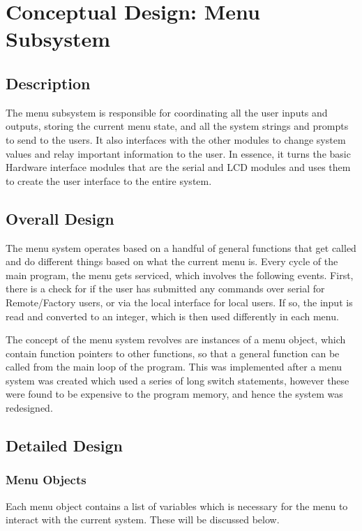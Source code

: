 \documentclass[]{report}
\begin{document}
\section{Conceptual Design: Menu Subsystem}
\subsection{Description}
The menu subsystem is responsible for coordinating all the user inputs and outputs, storing the current menu state, and all the system strings and prompts to send to the users. It also interfaces with the other modules to change system values and relay important information to the user. In essence, it turns the basic Hardware interface modules that are the serial and LCD modules and uses them to create the user interface to the entire system.

\subsection{Overall Design}
The menu system operates based on a handful of general functions that get called and do different things based on what the current menu is. Every cycle of the main program, the menu gets serviced, which involves the following events. First, there is a check for if the user has submitted any commands over serial for Remote/Factory users, or via the local interface for local users. If so, the input is read and converted to an integer, which is then used differently in each menu.

The concept of the menu system revolves are instances of a menu object, which contain function pointers to other functions, so that a general function can be called from the main loop of the program. This was implemented after a menu system was created which used a series of long switch statements, however these were found to be expensive to the program memory, and hence the system was redesigned.

\subsection{Detailed Design}

\subsubsection{Menu Objects}
Each menu object contains a list of variables which is necessary for the menu to interact with the current system. These will be discussed below.
\end{document}
